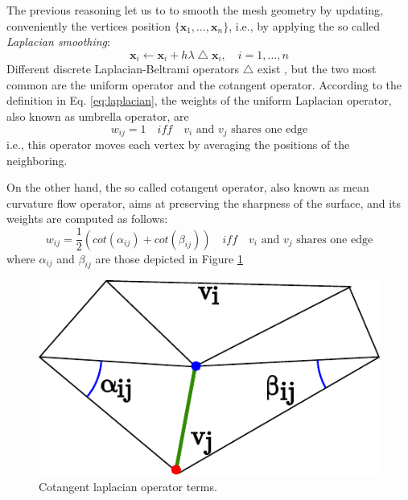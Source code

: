 The previous reasoning let us to to smooth the mesh geometry by updating, conveniently the vertices position $\{\mathbf{x}_1, \dots, \mathbf{x}_n\}$, i.e., by applying the so called \emph{Laplacian smoothing}:
\begin{equation}
\mathbf{x}_i \leftarrow  \mathbf{x}_i  + h \lambda \bigtriangleup \mathbf{x}_i , \quad i = 1, \dots, n
\end{equation}
Different discrete Laplacian-Beltrami operators $\bigtriangleup$ exist \cite{wardetzky2007discrete,sorkine2005laplacian}, but the two most common are the uniform operator and the cotangent operator.
According to the definition in Eq. \eqref{eq:laplacian}, the weights of the uniform Laplacian operator, also known as umbrella operator, are 
\begin{equation}
w_{ij} = 1 \quad iff \quad  \text{$v_i$ and $v_j$ shares one edge}
\end{equation}
i.e., this operator moves each vertex by averaging the positions of the neighboring.

On the other hand, the so called cotangent operator, also known as mean curvature flow operator, aims at preserving the sharpness of the surface, and its weights are computed as follows:
\begin{equation}
w_{ij} = \frac{1}{2} (cot(\alpha_{ij}) + cot(\beta_{ij})) \quad iff \quad \text{$v_i$ and $v_j$ shares one edge}
\end{equation}
where $\alpha_{ij}$ and $\beta_{ij}$ are those depicted in Figure \ref{fig:cotang}
\begin{figure}[t]
  \centering
  \includegraphics[width=0.7\columnwidth]{./img/laplacian}
  \caption{Cotangent laplacian operator terms.}
  \label{fig:cotang}
\end{figure}


